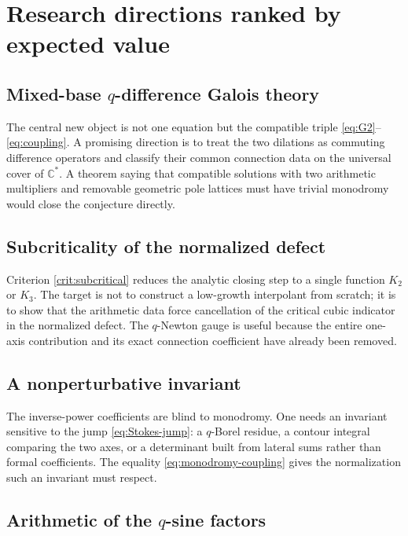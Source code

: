 \documentclass[11pt]{article}
\theoremstyle{definition}
\newcommand{\C}{\mathbb{C}}
\begin{document}
\section{Research directions ranked by expected value}

\subsection{Mixed-base $q$-difference Galois theory}

The central new object is not one equation but the compatible triple \eqref{eq:G2}--\eqref{eq:coupling}.  A promising direction is to treat the two dilations as commuting difference operators and classify their common connection data on the universal cover of $\C^*$.  A theorem saying that compatible solutions with two arithmetic multipliers and removable geometric pole lattices must have trivial monodromy would close the conjecture directly.

\subsection{Subcriticality of the normalized defect}

Criterion \ref{crit:subcritical} reduces the analytic closing step to a single function $K_2$ or $K_3$.  The target is not to construct a low-growth interpolant from scratch; it is to show that the arithmetic data force cancellation of the critical cubic indicator in the normalized defect.  The $q$-Newton gauge is useful because the entire one-axis contribution and its exact connection coefficient have already been removed.

\subsection{A nonperturbative invariant}

The inverse-power coefficients are blind to monodromy.  One needs an invariant sensitive to the jump \eqref{eq:Stokes-jump}: a $q$-Borel residue, a contour integral comparing the two axes, or a determinant built from lateral sums rather than formal coefficients.  The equality \eqref{eq:monodromy-coupling} gives the normalization such an invariant must respect.

\subsection{Arithmetic of the $q$-sine factors}
\end{document}
